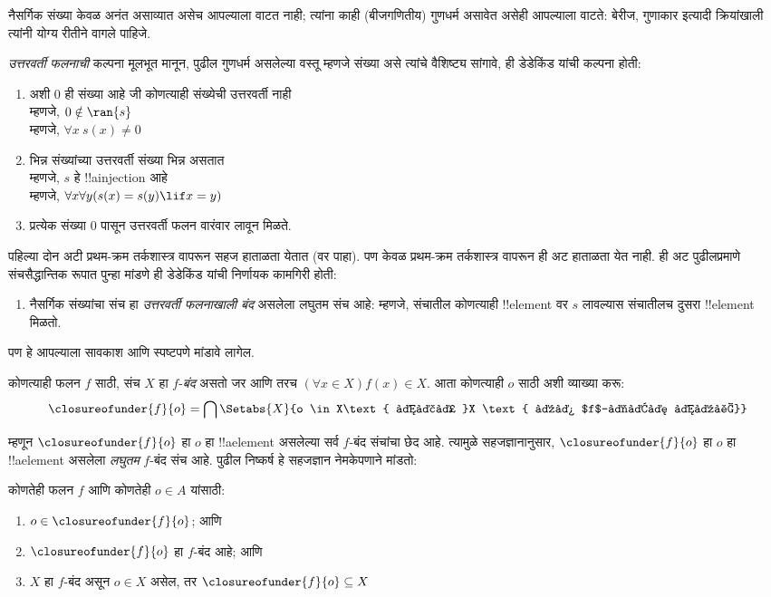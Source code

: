 \documentclass[../../../include/open-logic-section]{subfiles}
\begin{document}

नैसर्गिक संख्या केवळ अनंत असाव्यात असेच आपल्याला वाटत नाही; त्यांना काही
(बीजगणितीय) गुणधर्म असावेत असेही आपल्याला वाटते: बेरीज, गुणाकार इत्यादी
क्रियांखाली त्यांनी योग्य रीतीने वागले पाहिजे.

\emph{उत्तरवर्ती फलनाची} कल्पना मूलभूत मानून, पुढील गुणधर्म असलेल्या
वस्तू म्हणजे संख्या असे त्यांचे वैशिष्ट्य सांगावे, ही डेडेकिंड यांची
कल्पना होती:
\begin{enumerate}
	\item अशी $0$ ही संख्या आहे जी कोणत्याही संख्येची उत्तरवर्ती नाही
	\\म्हणजे, $0 \notin \ran{s}$
	\\म्हणजे, $\forall x\ s(x) \neq 0$
	\item भिन्न संख्यांच्या उत्तरवर्ती संख्या भिन्न असतात
	\\म्हणजे, $s$ हे !!a{injection} आहे
	\\म्हणजे, $\forall x \forall y (s(x) = s(y) \lif x = y)$
	\item{} प्रत्येक संख्या $0$ पासून
	उत्तरवर्ती फलन वारंवार लावून मिळते.
\end{enumerate}
पहिल्या दोन अटी प्रथम-क्रम तर्कशास्त्र वापरून सहज हाताळता येतात (वर
पाहा). पण केवळ प्रथम-क्रम तर्कशास्त्र वापरून 
ही अट हाताळता येत नाही.  ही अट पुढीलप्रमाणे
संचसैद्धान्तिक रूपात पुन्हा मांडणे ही डेडेकिंड यांची निर्णायक कामगिरी होती:
\begin{enumerate}
	\item[3$'$.] नैसर्गिक संख्यांचा संच हा \emph{उत्तरवर्ती फलनाखाली
	बंद} असलेला लघुतम संच आहे: म्हणजे, संचातील कोणत्याही !!{element} वर
	$s$ लावल्यास संचातीलच दुसरा !!{element} मिळतो.
\end{enumerate}
पण हे आपल्याला सावकाश आणि स्पष्टपणे मांडावे लागेल.

\begin{defn}
	कोणत्याही फलन $f$ साठी, संच $X$ हा $f$-\emph{बंद} असतो जर आणि तरच
	$(\forall x \in X)f(x) \in X$. आता कोणत्याही $o$ साठी अशी व्याख्या करू:
	$$\closureofunder{f}{o} = \bigcap\Setabs{X}{o \in X\text{ आणि }X
\text{ हा $f$-बंद आहे}}$$
\end{defn}

म्हणून $\closureofunder{f}{o}$ हा $o$ हा !!a{element} असलेल्या सर्व
$f$-बंद संचांचा छेद आहे. त्यामुळे सहजज्ञानानुसार,
$\closureofunder{f}{o}$ हा $o$ हा !!a{element} असलेला \emph{लघुतम}
$f$-बंद संच आहे. पुढील निष्कर्ष हे सहजज्ञान नेमकेपणाने मांडतो:
\begin{lem}
	कोणतेही फलन $f$ आणि कोणतेही $o \in A$ यांसाठी:
	\begin{enumerate}
		\item{} $o \in \closureofunder{f}{o}$; आणि
		\item{} $\closureofunder{f}{o}$ हा $f$-बंद आहे; आणि
		\item{} $X$ हा $f$-बंद असून $o \in
		X$ असेल, तर $\closureofunder{f}{o} \subseteq X$
	\end{enumerate}
\end{lem}
\end{document}
